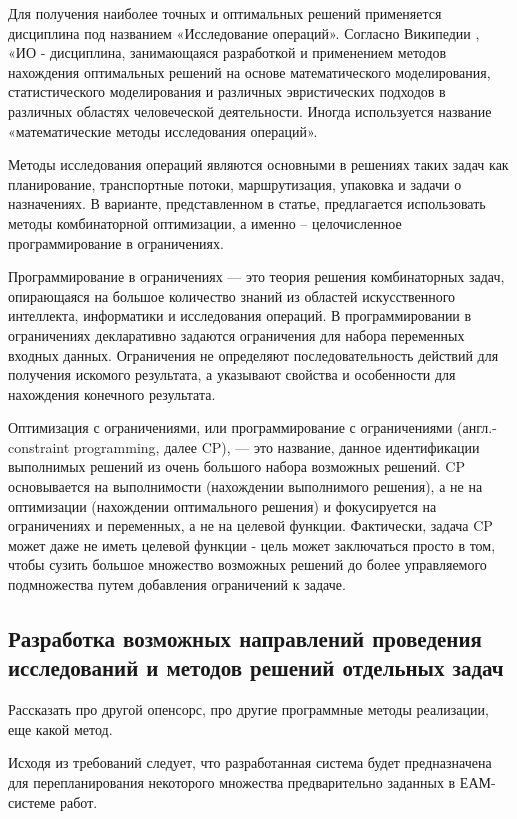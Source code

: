 Для получения наиболее точных и оптимальных решений применяется дисциплина под названием «Исследование операций». Согласно Википедии \cite{wikicp}, «ИО - дисциплина, занимающаяся разработкой и применением методов нахождения оптимальных решений на основе математического моделирования, статистического моделирования и различных эвристических подходов в различных областях человеческой деятельности. Иногда используется название «математические методы исследования операций».

Методы исследования операций являются основными в решениях таких задач как планирование, транспортные потоки, маршрутизация, упаковка и задачи о назначениях. В варианте, представленном в статье, предлагается использовать методы комбинаторной оптимизации, а именно – целочисленное программирование в ограничениях.

Программирование в ограничениях — это теория решения комбинаторных задач, опирающаяся на большое количество знаний из областей искусственного интеллекта, информатики и исследования операций. В программировании в ограничениях декларативно задаются ограничения для набора переменных входных данных. Ограничения не определяют последовательность действий для получения искомого результата, а указывают свойства и особенности для нахождения конечного результата. 

Оптимизация с ограничениями, или программирование с ограничениями (англ.- constraint programming, далее CP), — это название, данное идентификации выполнимых решений из очень большого набора возможных решений. CP основывается на выполнимости (нахождении выполнимого решения), а не на оптимизации (нахождении оптимального решения) и фокусируется на ограничениях и переменных, а не на целевой функции. Фактически, задача CP может даже не иметь целевой функции - цель может заключаться просто в том, чтобы сузить большое множество возможных решений до более управляемого подмножества путем добавления ограничений к задаче.

\subsection{Разработка возможных направлений проведения исследований и методов решений отдельных задач}
Рассказать про другой опенсорс, про другие программные методы реализации, еще какой метод.

Исходя из требований следует, что разработанная система будет предназначена для перепланирования некоторого множества предварительно заданных в ЕАМ-системе работ.

